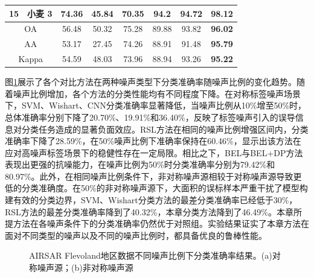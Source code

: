 \begin{table}[ht!]
\begin{tabular}{cccccccc}
        15                        & 小麦 3  & 74.36 & 45.84   & 70.35 & 94.2           & 94.72          & \textbf{98.12} \\
        \midrule[0.75bp]
        \multicolumn{2}{c}{OA}    & 56.48 & 50.32 & 75.28   & 89.88 & 93.82          & \textbf{96.02}                  \\
        \multicolumn{2}{c}{AA}    & 53.17 & 27.45 & 74.26   & 88.91 & 91.48          & \textbf{95.79}                  \\
        \multicolumn{2}{c}{Kappa} & 54.59 & 48.03 & 73.96   & 88.94 & 93.26          & \textbf{95.22}                  \\
        \bottomrule[1.5bp]
    \end{tabular}
\end{table}

图\ref{fig:fle_noise}展示了各个对比方法在两种噪声类型下分类准确率随噪声比例的变化趋势。随着噪声比例增加，各个方法的分类性能均有不同程度下降。在对称标签噪声场景下，SVM、Wishart、CNN分类准确率显著降低，当噪声比例从10\%增至50\%时，总体准确率分别下降了20.70\%、19.91\%和36.40\%，反映了标签噪声引入的误导信息对分类任务造成的显著负面效应。RSL方法在相同的噪声比例增强区间内，分类准确率下降了28.59\%，在50\%噪声比例下准确率保持在60.46\%，显示出该方法在应对高噪声标签场景下的稳健性存在一定局限。相比之下，BEL与BEL+DP方法表现出更强的抗噪能力，在噪声比例为50\%时分类准确率分别为79.42\%和80.97\%。此外，在相同噪声比例条件下，非对称噪声源相较于对称噪声源导致更低的分类准确度。在50\%的非对称噪声源下，大面积的误标样本严重干扰了模型构建有效的分类边界，SVM、Wishart分类方法的最差分类准确率已经低于30\%，RSL方法的最差分类准确率降到了40.32\%，本章分类方法降到了46.49\%。本章所提方法在各噪声条件下的分类准确率仍然优于对照组。实验结果证实了本章方法在面对不同类型的噪声以及不同的噪声比例时，都具备优良的鲁棒性能。

\begin{figure}[ht!]
    \caption{AIRSAR Flevoland地区数据不同噪声比例下分类准确率结果。(a)对称噪声源；(b)非对称噪声源}
    \label{fig:fle_noise}
\end{figure}

